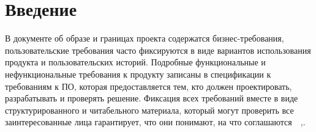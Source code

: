 \chapter*{Введение}
\label{ch:intro}

В документе об образе и границах проекта содержатся бизнес-требования, пользовательские требования часто фиксируются в
виде вариантов использования продукта и пользовательских историй.
Подробные функциональные и нефункциональные требования к продукту записаны в спецификации к требованиям к ПО,
которая предоставляется тем, кто должен проектировать, разрабатывать и проверять решение.
Фиксация всех требований вместе в виде структурированного и читабельного материала, который могут проверить
все заинтересованные лица гарантирует, что они понимают, на что соглашаются~\cite{vigers,vigersRu}~,.
\endinput
